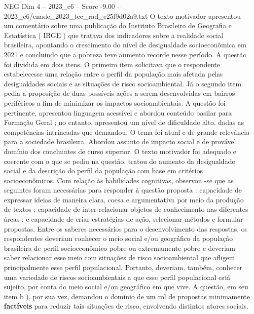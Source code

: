 \begin{textsample}{NEG Dim 4 – 2023\_c6 – Score -9.00 – 2023\_c6/enade\_2023\_tec\_rad\_e25f9d02a9.txt}
O texto motivador apresentou um comentário sobre uma publicação do Instituto Brasileiro de Geografia e Estatística ( IBGE ) que tratava dos indicadores sobre a realidade social brasileira, apontando o crescimento do nível de desigualdade socioeconômica em 2021 e concluindo que a pobreza teve aumento recorde nesse período.
A questão foi dividida em dois itens.
O primeiro item solicitava que o respondente estabelecesse uma relação entre o perfil da população mais afetada pelas desigualdades sociais e as situações de risco socioambiental.
Já o segundo item pedia a proposição de duas possíveis ações a serem desenvolvidas em bairros periféricos a fim de minimizar os impactos socioambientais.
A questão foi pertinente, apresentou linguagem acessível e abordou conteúdo basilar para Formação Geral ; no entanto, apresentou um nível de dificuldade alto, dadas as competências intrincadas que demandou.
O tema foi atual e de grande relevância para a sociedade brasileira.
Abordou assunto de impacto social e de provável domínio dos concluintes de curso superior.
O texto motivador foi adequado e coerente com o que se pediu na questão, tratou do aumento da desigualdade social e da descrição do perfil da população com base em critérios socioeconômicos.
Com relação às habilidades cognitivas, observou -se que as seguintes foram necessárias para responder à questão proposta : capacidade de expressar ideias de maneira clara, coesa e argumentativa por meio da produção de textos ; capacidade de inter-relacionar objetos de conhecimento nas diferentes áreas ; e capacidade de criar estratégias de ação, selecionar métodos e formular propostas.
Entre os saberes necessários para o desenvolvimento das respostas, os respondentes deveriam conhecer o meio social e/ou geográfico da população brasileira de perfil socioeconômico pobre ou extremamente pobre e deveriam saber relacionar esse meio com situações de risco socioambiental que afligem principalmente esse perfil populacional.
Portanto, deveriam, também, conhecer uma variedade de riscos socioambientais a que esse perfil populacional está sujeito, por conta do meio social e/ou geográfico em que vive.
A questão, em seu item b ), por sua vez, demandou o domínio de um rol de propostas minimamente \textbf{factíveis} para reduzir tais situações de risco, envolvendo distintos atores sociais.

\end{textsample}
